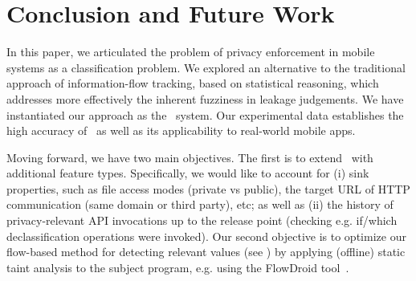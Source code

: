 \section{Conclusion and Future Work}\label{Se:conclusion}

In this paper, we articulated the problem of privacy enforcement in mobile systems as a classification problem. 
We explored an alternative to the traditional approach of information-flow tracking, based on statistical reasoning, which addresses more effectively the inherent fuzziness in leakage judgements. We have instantiated our approach as the \Tool\ system. Our experimental data establishes the high accuracy of \Tool\ as well as its applicability to real-world mobile apps.


Moving forward, we have two main objectives. The first is to extend \Tool\ with additional feature types. Specifically, we would like to account for (i) sink properties, such as file access modes (private vs public), the target URL of HTTP communication (same domain or third party), etc; as well as (ii) the history of privacy-relevant API invocations up to the release point (checking e.g. if/which declassification operations were invoked). Our second objective is to optimize our flow-based method for detecting relevant values (see ) by applying (offline) static taint analysis to the subject program, e.g. using the FlowDroid tool~\cite{FARBBKTOM:PLDI14}.  